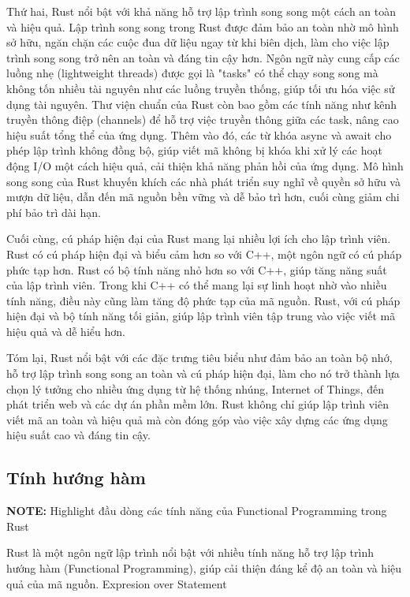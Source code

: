 Thứ hai, Rust nổi bật với khả năng hỗ trợ lập trình song song một cách an toàn và hiệu quả. Lập trình song song trong Rust được đảm bảo an toàn nhờ mô hình sở hữu, ngăn chặn các cuộc đua dữ liệu ngay từ khi biên dịch, làm cho việc lập trình song song trở nên an toàn và đáng tin cậy hơn. Ngôn ngữ này cung cấp các luồng nhẹ (lightweight threads) được gọi là "tasks" có thể chạy song song mà không tốn nhiều tài nguyên như các luồng truyền thống, giúp tối ưu hóa việc sử dụng tài nguyên. Thư viện chuẩn của Rust còn bao gồm các tính năng như kênh truyền thông điệp (channels) để hỗ trợ việc truyền thông giữa các task, nâng cao hiệu suất tổng thể của ứng dụng. Thêm vào đó, các từ khóa async và await cho phép lập trình không đồng bộ, giúp viết mã không bị khóa khi xử lý các hoạt động I/O một cách hiệu quả, cải thiện khả năng phản hồi của ứng dụng. Mô hình song song của Rust khuyến khích các nhà phát triển suy nghĩ về quyền sở hữu và mượn dữ liệu, dẫn đến mã nguồn bền vững và dễ bảo trì hơn, cuối cùng giảm chi phí bảo trì dài hạn.

Cuối cùng, cú pháp hiện đại của Rust mang lại nhiều lợi ích cho lập trình viên. Rust có cú pháp hiện đại và biểu cảm hơn so với C++, một ngôn ngữ có cú pháp phức tạp hơn. Rust có bộ tính năng nhỏ hơn so với C++, giúp tăng năng suất của lập trình viên. Trong khi C++ có thể mang lại sự linh hoạt nhờ vào nhiều tính năng, điều này cũng làm tăng độ phức tạp của mã nguồn. Rust, với cú pháp hiện đại và bộ tính năng tối giản, giúp lập trình viên tập trung vào việc viết mã hiệu quả và dễ hiểu hơn\cite{2022research}.

Tóm lại, Rust nổi bật với các đặc trưng tiêu biểu như đảm bảo an toàn bộ nhớ, hỗ trợ lập trình song song an toàn và cú pháp hiện đại, làm cho nó trở thành lựa chọn lý tưởng cho nhiều ứng dụng từ hệ thống nhúng, Internet of Things, đến phát triển web và các dự án phần mềm lớn. Rust không chỉ giúp lập trình viên viết mã an toàn và hiệu quả mà còn đóng góp vào việc xây dựng các ứng dụng hiệu suất cao và đáng tin cậy.

\subsection{Tính hướng hàm}

\textbf{NOTE:} Highlight đầu dòng các tính năng của Functional Programming trong Rust

Rust là một ngôn ngữ lập trình nổi bật với nhiều tính năng hỗ trợ lập trình hướng hàm (Functional Programming), giúp cải thiện đáng kể độ an toàn và hiệu quả của mã nguồn. Expresion over Statement

